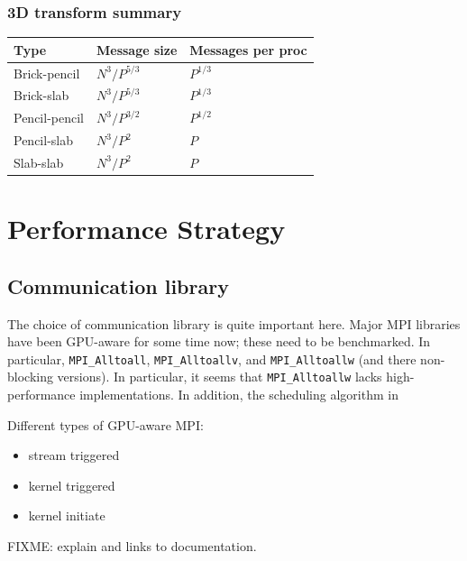 \documentclass[12pt]{article}
\renewcommand{\(}{\left(}
\renewcommand{\)}{\right)}
\begin{document}
\subsubsection{3D transform summary}

\begin{centering}
  \begin{table}[htbp]
    \begin{tabular}{|l|l|l|}
      \hline
      Type          & Message size  & Messages per proc \\
      \hline
      Brick-pencil  & $N^3/P^{5/3}$ & $P^{1/3}$          \\
      Brick-slab    & $N^3/P^{5/3}$ & $P^{1/3}$          \\
      Pencil-pencil & $N^3/P^{3/2}$ & $P^{1/2}$        \\
      Pencil-slab   & $N^3/P^2$    & $P$               \\
      Slab-slab     & $N^3/P^2$    & $P$               \\
      \hline
    \end{tabular}
  \end{table}
\end{centering}

\section{Performance Strategy}

\subsection{Communication library}

The choice of communication library is quite important here.  Major
MPI libraries have been GPU-aware for some time now; these need to be
benchmarked.  In particular, \texttt{MPI_Alltoall},
\texttt{MPI_Alltoallv}, and \texttt{MPI_Alltoallw} (and there
non-blocking versions).  In particular, it seems that
\texttt{MPI_Alltoallw} lacks high-performance implementations.  In
addition, the scheduling algorithm
in~\cite{schreuder1980constructing}

Different types of GPU-aware MPI:
\begin{itemize}
\item stream triggered
\item kernel triggered
\item kernel initiate
\end{itemize}
FIXME: explain and links to documentation.
\end{document}
